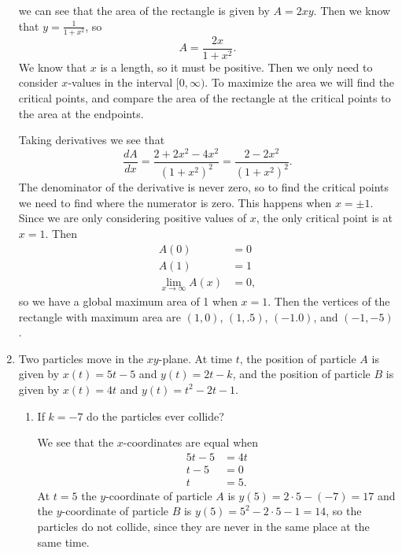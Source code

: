 \documentclass[11pt]{article}
\begin{document}
\begin{enumerate}
\begin{center}
  \end{center}
  we can see that the area of the rectangle is given by $A=2xy$.  Then
  we know that $y=\frac{1}{1+x^2}$, so
  \[
  A=\frac{2x}{1+x^2}.
  \]
  We know that $x$ is a length, so it must be positive.  Then we only
  need to consider $x$-values in the interval $[0,\infty)$.  To
  maximize the area we will find the critical points, and compare the
  area of the rectangle at the critical points to the area at the
  endpoints.

  Taking derivatives we see that
  \[
  \frac{dA}{dx} = \frac{2+2x^2-4x^2}{(1+x^2)^2} =
  \frac{2-2x^2}{(1+x^2)^2}.
  \]
  The denominator of the derivative is never zero, so to find the
  critical points we need to find where the numerator is zero.  This
  happens when $x=\pm 1$.  Since we are only considering positive
  values of $x$, the only critical point is at $x=1$.  Then
  \begin{align*}
    A(0) &= 0\\
    A(1) &= 1\\
    \lim_{x\to\infty} A(x) &= 0,
  \end{align*}
  so we have a global maximum area of 1 when $x=1$.  Then the vertices
  of the rectangle with maximum area are $(1,0)$, $(1,.5)$, $(-1.0)$,
  and $(-1,-5)$.

  \vfill
  
  \newpage
  
\item Two particles move in the $xy$-plane.  At time $t$, the position
  of particle $A$ is given by $x(t) = 5t - 5$ and $y(t) = 2t - k$, and
  the position of particle $B$ is given by $x(t) = 4t$ and $y(t) = t^2
  - 2t - 1$.
  \begin{enumerate}
  \item If $k=-7$ do the particles ever collide?

    \vfill

    We see that the $x$-coordinates are equal when
    \begin{align*}
      5t-5 &= 4t\\
      t-5 &= 0\\
      t &= 5.
    \end{align*}
    At $t=5$ the $y$-coordinate of particle $A$ is $y(5)=2\cdot 5 -
    (-7)= 17$ and the $y$-coordinate of particle $B$ is
    $y(5)=5^2-2\cdot 5 -1 = 14$, so the particles do not collide,
    since they are never in the same place at the same time.


\end{enumerate}
\end{enumerate}
\end{document}
